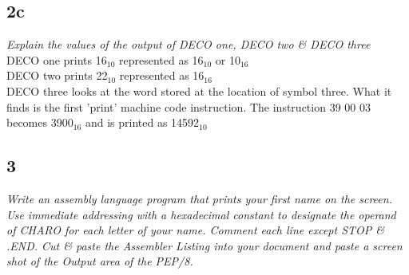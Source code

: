 \documentclass[a4paper,man,natbib]{apa6}
\begin{document}
\subsection{2c}
\emph{Explain the values of the output of DECO one, DECO two \& DECO three} \\
DECO one prints 16$_{10}$ represented as 16$_{10}$ or 10$_{16}$ \\
DECO two prints 22$_{10}$ represented as 16$_{16}$ \\
DECO three looks at the word stored at the location of symbol three. What it finds is the first 'print' machine code instruction. The instruction 39 00 03 becomes 3900$_{16}$ and is printed as 14592$_{10}$ \\
\subsection{3}
\emph{Write an assembly language program that prints your first name on the screen. Use immediate addressing with a hexadecimal constant to designate the operand of CHARO for each letter of your name. Comment each line except STOP \& .END. Cut \& paste the Assembler Listing into your document and paste a screen shot of the Output area of the PEP/8.} \\
\end{document}
